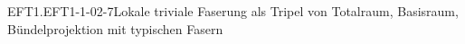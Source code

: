 \begin{DEF}{EFT1.EFT1-1-02-7}{Lokale triviale Faserung als Tripel von Totalraum, Basisraum, Bündelprojektion mit typischen Fasern}

\end{DEF}
